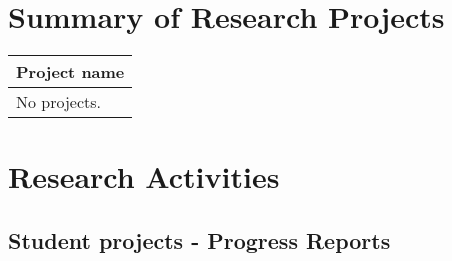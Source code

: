 \documentclass[version=last, paper=a4, DIV=18, usenames, dvipsnames]{scrartcl}
\begin{document}
\clearpage

    
\section{Summary of Research Projects}

\begin{longtabu} to \linewidth { | X |}
\hline
{}
Project name\\
\hline
\endhead

  No projects. \\ \hline

\end{longtabu}

\clearpage

    
\section{Research Activities}



\clearpage

    
\subsection{Student projects - Progress Reports}



    
\end{document}
